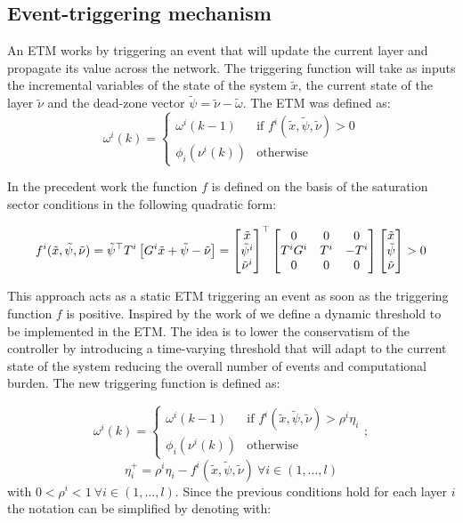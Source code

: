 \documentclass{article}
\begin{document}
\subsection{Event-triggering mechanism}
An ETM works by triggering an event that will update the current layer and propagate its value across the network. The triggering function will take as inputs the incremental variables of the state of the system 
$\tilde{x}$, the current state of the layer $\tilde{\nu}$ and the dead-zone vector $\tilde{\psi} = \tilde{\nu} - \tilde{\omega}$. The ETM was defined as:
\begin{equation}
  \omega^{i}(k) = \begin{cases}
    \omega^{i}(k-1) & \text{if } f^i(\tilde{x}, \tilde{\psi}, \tilde{\nu}) > 0\\
    \phi_i(\nu^i(k)) & \text{otherwise}
  \end{cases}
\end{equation}

In the precedent work \cite{css-extended} the function $f$ is defined on the basis of the saturation sector conditions in the following quadratic form:

\begin{equation}\label{eqn:base_omega}
  f^i(\tilde{x}, \tilde{\psi}, \tilde{\nu}) = 
  \tilde{\psi}^\top T^i \left[ G^i \tilde{x} + \tilde{\psi} - \tilde{\nu} \right] = 
  \left[\begin{matrix}\tilde{x}\\ \tilde{\psi}^i \\ \tilde{\nu}^i\end{matrix}\right]^\top
  \left[\begin{matrix}
    0 & 0 & 0\\
    T^i G^i & T^i & -T^i\\
    0 & 0 & 0
  \end{matrix}\right] 
  \left[\begin{matrix}\tilde{x}\\ \tilde{\psi} \\ \tilde{\nu}\end{matrix}\right] > 0
\end{equation}

This approach acts as a static ETM triggering an event as soon as the triggering function $f$ is positive. Inspired by the work of \cite{data-driven} we define a dynamic threshold to be implemented in the ETM. The idea is to lower the conservatism of the controller by introducing a time-varying threshold that will adapt to the current state of the system reducing the overall number of events and computational burden. The new triggering function is defined as:

\begin{equation}
  \omega^{i}(k) = \begin{cases}
    \omega^{i}(k-1) & \text{if } f^i(\tilde{x}, \tilde{\psi}, \tilde{\nu}) > \rho^i \eta_i\\
    \phi_i(\nu^i(k)) & \text{otherwise}
  \end{cases};
\end{equation}
\begin{equation}
  \eta^+_i = \rho^i \eta_i - f^i(\tilde{x}, \tilde{\psi}, \tilde{\nu})\  \forall i \in \left( 1, \dots, l \right) 
\end{equation}
with $0 < \rho^i < 1 \ \forall i \in \left( 1, \dots, l \right)$. Since the previous conditions hold for each layer $i$ the notation can be simplified by denoting with:
\end{document}
